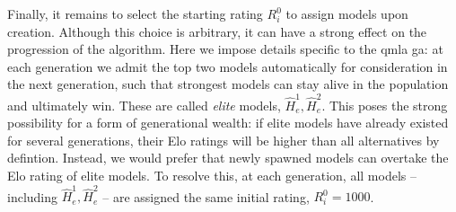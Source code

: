 \par 
Finally, it remains to select the starting rating $R_i^0$ to assign models upon creation. 
Although this choice is arbitrary, it can have a strong effect on the progression of the algorithm. 
Here we impose details specific to the \gls{qmla} \gls{ga}: 
    at each generation we admit the top two  models automatically 
    for consideration in the next generation, 
    such that strongest models can stay alive in the population and ultimately win. 
These are called \emph{elite} models, $\hat{H}_e^1, \hat{H}_e^2$. 
This poses the strong possibility for a form of generational wealth:
    if elite models have already existed for several generations, 
    their \glspl{Elo rating} will be higher than all alternatives by defintion. 
Instead, we would prefer that newly spawned models can overtake the \gls{Elo rating} of elite models. 
To resolve this, at each generation, all models -- including $\hat{H}_e^1, \hat{H}_e^2$ -- 
    are assigned the same initial rating, $R_i^0=1000$. 

    

